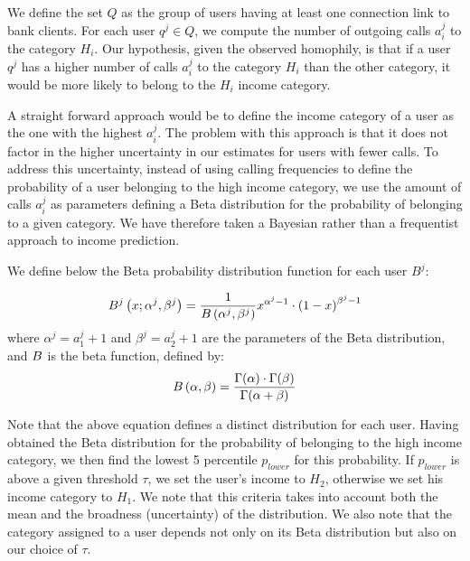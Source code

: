 We define the set $Q$ as the group of users having at least one connection link to bank clients. For each user $q^j \in Q$, we compute the number of outgoing calls $a^j_i$ to the category $H_i$. Our hypothesis, given the observed homophily, is that if a user $q^j$ has a higher number of calls $a^j_i$ to the category $H_i$ than the other category, it would be more likely to belong to the $H_i$ income category. 

A straight forward approach would be to define the income category of a user as the one with the highest $a^j_i$. The problem with this approach is that it does not factor in the higher uncertainty in our estimates for users with fewer calls. To address this uncertainty, instead of using calling frequencies to define the probability of a user belonging to the high income category, we use the amount of calls $a^j_i$  as parameters defining a Beta distribution for the probability of belonging to a given category. We have therefore taken a Bayesian rather than a frequentist approach to income prediction. 

We define below the Beta probability distribution function for each user $B^j$:  


\begin{equation}
	B^j \left( x; \alpha^j,\beta^j \right) = \frac{1}{B \left( \alpha^j, \beta^j \right)} x^{\alpha^j - 1} \cdot {(1-x)}^{\beta^j - 1}
\label{Beta}
\end{equation}
where $\alpha^j = a^j_1 +1$ and $\beta^j = a^j_2 +1$ are the parameters of the Beta distribution, 
and $B$ is the beta function, defined by:
\begin{equation}
B \left( \alpha, \beta \right) = 
\frac{\Gamma \! \left( \alpha \right) \cdot \Gamma \! \left( \beta \right)}
{\Gamma \! \left( \alpha + \beta \right)}
\label{Beta} 
\end{equation}


Note that the above equation defines a distinct distribution for each user. Having obtained the Beta distribution for the probability of belonging to the high income category, we then find the lowest 5 percentile $p_{lower}$ for this probability. If $p_{lower}$ is above a given threshold $\tau$, we set the user's income to $H_2$, otherwise we set his income category to $H_1$. We note that this criteria takes into account both the mean and the broadness (uncertainty) of the distribution. We also note that the category assigned to a user depends not only on its Beta distribution but also on our choice of $\tau$. 

